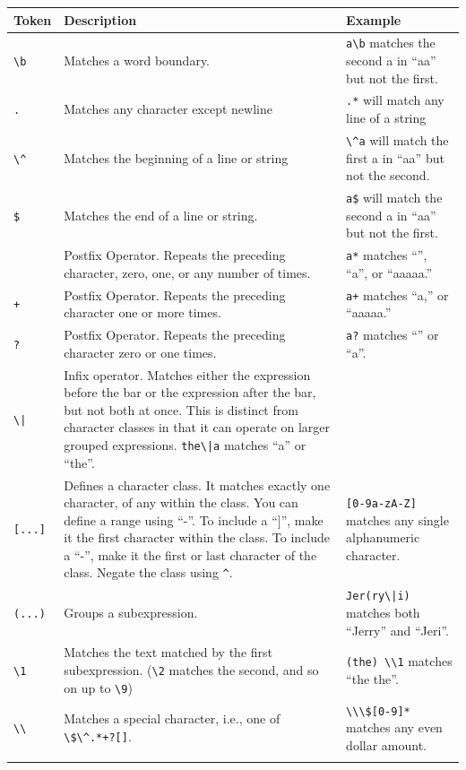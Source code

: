 \documentclass[10pt]{book}
\begin{document}
{\begin{tabular}{l | l | l}
\hline
Token & Description & Example \\ \hline
\verb"\b" & Matches a word boundary. & \verb"a\b" matches the second a in ``aa'' but not the first. \\ \hline
{\tt .} & Matches any character except newline & {\tt .*} will match any line of a string \\ \hline
\verb"\^" & Matches the beginning of a line or string & \verb"\^a" will match the first a in ``aa'' but not the second. \\ \hline
{\tt \$} & Matches the end of a line or string. & {\tt a\$} will match the second a in ``aa'' but not the first. \\ \hline
{\tt *} & Postfix Operator. Repeats the preceding character, zero, one, or any number of times. & {\tt a*} matches ``'', ``a'', or ``aaaaa.''\\ \hline
{\tt +} & Postfix Operator. Repeats the preceding character one or more times. & {\tt a+} matches ``a,'' or ``aaaaa.''\\ \hline
{\tt ?} & Postfix Operator. Repeats the preceding character zero or one times. & {\tt a?} matches ``'' or ``a''.\\ \hline
\verb"\|" & Infix operator. Matches either the expression before the bar or the expression after the bar, but not both at once. This is distinct from character classes in that it can operate on larger grouped expressions.  \verb"the\|a" matches ``a'' or ``the''. \\ \hline
\verb"[...]" & Defines a character class. It matches exactly one character, of any within the class. You can define a range using ``-''. To include a ``]'', make it the first character within the class. To include a ``-'', make it the first or last character of the class. Negate the class using \verb"^". & \verb"[0-9a-zA-Z]" matches any single alphanumeric character. \\ \hline
\verb"(...)" & Groups a subexpression. & \verb"Jer(ry\|i)" matches both ``Jerry'' and ``Jeri''. \\ \hline
\verb"\1" & Matches the text matched by the first subexpression. (\verb"\2" matches the second, and so on up to \verb"\9") & \verb"(the) \\1" matches ``the the''. \\ \hline
\verb"\\" & Matches a special character, i.e., one of \verb"\$\^.*+?[]". & \verb"\\\$[0-9]*" matches any even dollar amount. \\ \hline
\label{tab:regex}
\end{tabular}

}
\end{document}
